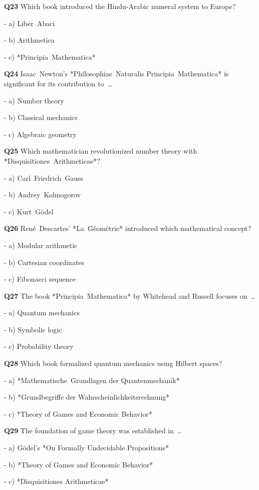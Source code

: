 \textbf{Q23} Which book introduced the Hindu‑Arabic numeral system to Europe?\par
\quad - a) Liber Abaci\par
\quad - b) Arithmetica\par
\quad - c) *Principia Mathematica*\par

\textbf{Q24} Isaac Newton's *Philosophiae Naturalis Principia Mathematica* is significant for its contribution to …\par
\quad - a) Number theory\par
\quad - b) Classical mechanics\par
\quad - c) Algebraic geometry\par

\textbf{Q25} Which mathematician revolutionized number theory with *Disquisitiones Arithmeticae*?\par
\quad - a) Carl Friedrich Gauss\par
\quad - b) Andrey Kolmogorov\par
\quad - c) Kurt Gödel\par

\textbf{Q26} René Descartes' *La Géométrie* introduced which mathematical concept?\par
\quad - a) Modular arithmetic\par
\quad - b) Cartesian coordinates\par
\quad - c) Fibonacci sequence\par

\textbf{Q27} The book *Principia Mathematica* by Whitehead and Russell focuses on …\par
\quad - a) Quantum mechanics\par
\quad - b) Symbolic logic\par
\quad - c) Probability theory\par

\textbf{Q28} Which book formalized quantum mechanics using Hilbert spaces?\par
\quad - a) *Mathematische Grundlagen der Quantenmechanik*\par
\quad - b) *Grundbegriffe der Wahrscheinlichkeitsrechnung*\par
\quad - c) *Theory of Games and Economic Behavior*\par

\textbf{Q29} The foundation of game theory was established in …\par
\quad - a) Gödel's *On Formally Undecidable Propositions*\par
\quad - b) *Theory of Games and Economic Behavior*\par
\quad - c) *Disquisitiones Arithmeticae*\par


